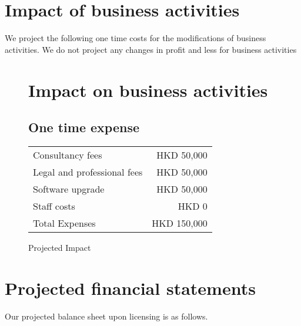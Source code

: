 \section{Impact of business activities}

We project the following one time costs for the modifications of
business activities.  We do not project any changes in profit and less
for business activities

\begin{figure}[h]
  \centering
  \caption{Projected Impact}
  \label{fig:financial_statement}
  
  \section*{Impact on business activities}
  
  \subsection*{One time expense}
  \begin{tabular}{lr}
    Consultancy fees & HKD 50,000 \\
    Legal and professional fees & HKD 50,000 \\
    Software upgrade & HKD 50,000 \\
    Staff costs & HKD 0 \\
    \midrule
    Total Expenses & HKD 150,000 \\
  \end{tabular}
\end{figure}


\section{Projected financial statements}

Our projected balance sheet upon licensing is as follows.

